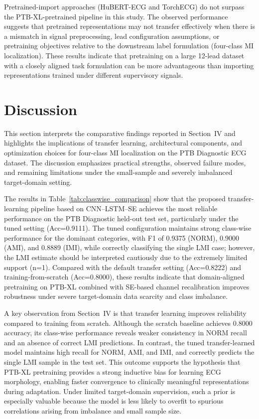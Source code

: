\documentclass[preprint,12pt]{elsarticle}
\begin{document}
Pretrained-import approaches (HuBERT-ECG and TorchECG) do not surpass the PTB-XL-pretrained pipeline in this study. The observed performance suggests that pretrained representations may not transfer effectively when there is a mismatch in signal preprocessing, lead configuration assumptions, or pretraining objectives relative to the downstream label formulation (four-class MI localization). These results indicate that pretraining on a large 12-lead dataset with a closely aligned task formulation can be more advantageous than importing representations trained under different supervisory signals.




\section{Discussion}
This section interprets the comparative findings reported in Section~IV and highlights the implications of transfer learning, architectural components, and optimization choices for four-class MI localization on the PTB Diagnostic ECG dataset. The discussion emphasizes practical strengths, observed failure modes, and remaining limitations under the small-sample and severely imbalanced target-domain setting.

The results in Table~\ref{tab:classwise_comparison} show that the proposed transfer-learning pipeline based on CNN--LSTM--SE achieves the most reliable performance on the PTB Diagnostic held-out test set, particularly under the tuned setting (Acc=0.9111). The tuned configuration maintains strong class-wise performance for the dominant categories, with F1 of 0.9375 (NORM), 0.9000 (AMI), and 0.8889 (IMI), while correctly classifying the single LMI case; however, the LMI estimate should be interpreted cautiously due to the extremely limited support (n=1). Compared with the default transfer setting (Acc=0.8222) and training-from-scratch (Acc=0.8000), these results indicate that domain-aligned pretraining on PTB-XL combined with SE-based channel recalibration improves robustness under severe target-domain data scarcity and class imbalance.

A key observation from Section~IV is that transfer learning improves reliability compared to training from scratch. Although the scratch baseline achieves 0.8000 accuracy, its class-wise performance reveals weaker consistency in NORM recall and an absence of correct LMI predictions. In contrast, the tuned transfer-learned model maintains high recall for NORM, AMI, and IMI, and correctly predicts the single LMI sample in the test set. This outcome supports the hypothesis that PTB-XL pretraining provides a strong inductive bias for learning ECG morphology, enabling faster convergence to clinically meaningful representations during adaptation. Under limited target-domain supervision, such a prior is especially valuable because the model is less likely to overfit to spurious correlations arising from imbalance and small sample size.
\end{document}
